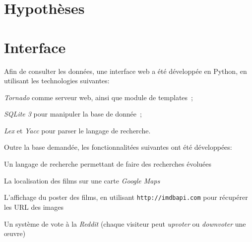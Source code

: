 \documentclass[a4paper,12pt]{article}
\begin{document}
\begin{list}{-}{}
\section{Hypothèses}
\section{Interface}
Afin de consulter les données, une interface web a été développée en
Python, en utilisant les technologies suivantes:
\begin{list}{-}{}
  \item \emph{Tornado} comme serveur web, ainsi que module de templates~;
  \item \emph{SQLite 3} pour manipuler la base de donnée~;
  \item \emph{Lex} et \emph{Yacc} pour parser le langage de recherche.
\end{list}

Outre la base demandée, les fonctionnalitées suivantes ont été développées:
\begin{list}{-}{}
  \item Un langage de recherche permettant de faire des recherches évoluées
  \item La localisation des films sur une carte \emph{Google Maps}
  \item L'affichage du poster des films, en utilisant
    \texttt{http://imdbapi.com} pour récupérer les URL des images
  \item Un système de vote à la \emph{Reddit} (chaque visiteur peut
    \emph{upvoter} ou \emph{downvoter} une œuvre)
\end{list}

\end{list}
\end{document}
